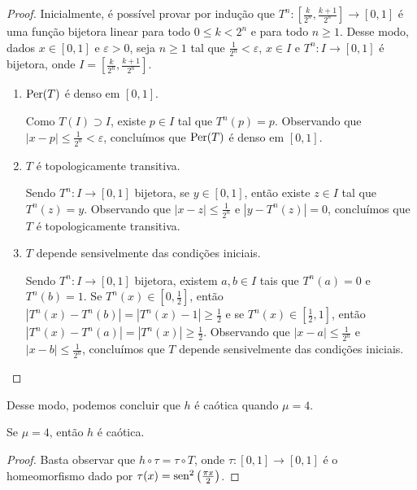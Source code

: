 \begin{proof}
Inicialmente, é possível provar por indução que $T^n: [\frac{k}{2^n}, \frac{k+1}{2^n}] \to [0,1]$ é uma função bijetora linear para todo $0 \leq k  < 2^n$ e para todo $n \geq 1$.
Desse modo, dados $x \in [0, 1]$ e $\varepsilon > 0$, seja $n \geq 1$ tal que $\frac{1}{2^n} < \varepsilon$, $x \in I$ e $T^n: I \to [0,1]$ é bijetora, onde $I = \left[\frac{k}{2^n}, \frac{k+1}{2^n}\right]$.

\begin{enumerate}[label=\alph*)]
\item $\operatorname{Per}(T)$ é denso em $[0, 1]$.

Como $T(I) \supset I$, existe $p \in I$ tal que $T^n(p) = p$. Observando que $|x-p| \leq \frac{1}{2^n} < \varepsilon$, concluímos que $\operatorname{Per}(T)$ é denso em $[0, 1]$.

\item $T$ é topologicamente transitiva.

Sendo $T^n: I \to [0,1]$ bijetora, se $y \in [0, 1]$, então existe $z \in I$ tal que $T^n(z) = y$.
Observando que $|x - z| \leq \frac{1}{2^n}$ e $|y - T^n(z)| = 0$, concluímos que $T$ é topologicamente transitiva.

\item $T$ depende sensivelmente das condições iniciais.

Sendo $T^n: I \to [0,1]$ bijetora, existem $a, b \in I$ tais que $T^n(a) = 0$ e $T^n(b) = 1$. Se $T^n(x) \in [0, \frac{1}{2}]$, então $|T^n(x) - T^n(b)| = |T^n(x) - 1| \geq \frac{1}{2}$ e se $T^n(x) \in [\frac{1}{2}, 1]$, então $|T^n(x) - T^n(a)| = |T^n(x)| \geq \frac{1}{2}$. Observando que $|x - a| \leq \frac{1}{2^n}$ e $|x - b| \leq \frac{1}{2^n}$, concluímos que $T$ depende sensivelmente das condições iniciais.
\end{enumerate}
\end{proof}

Desse modo, podemos concluir que $h$ é caótica quando $\mu = 4$.

\begin{theorem}
Se $\mu = 4$, então $h$ é caótica.
\end{theorem}

\begin{proof}
Basta observar que $h \circ \tau = \tau \circ T$, onde $\tau: [0, 1] \to [0, 1]$ é o homeomorfismo dado por $\tau(x) = \operatorname{sen}^2\left(\frac{\pi x}{2}\right)$.
\end{proof}
